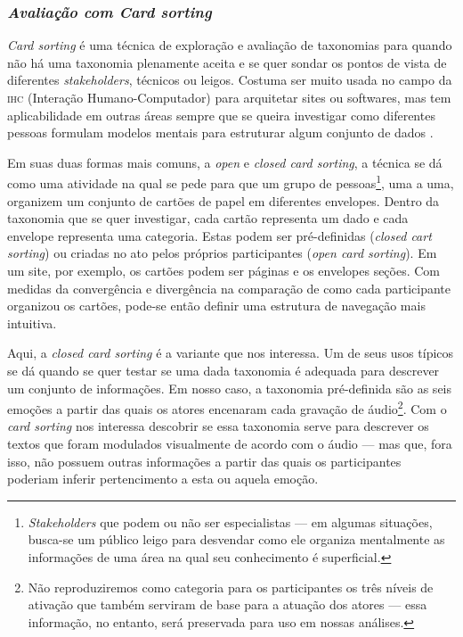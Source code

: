 \documentclass[a4paper,11pt,titlepage,singlespacing]{article}
\begin{document}
\subsubsection*{\textit{Avaliação com Card sorting}}

\textit{Card sorting} é uma técnica de exploração e avaliação de taxonomias para quando não há uma taxonomia plenamente aceita e se quer sondar os pontos de vista de diferentes \textit{stakeholders}, técnicos ou leigos. Costuma ser muito usada no campo da \textsc{ihc} (Interação Humano-Computador) para arquitetar sites ou softwares, mas tem aplicabilidade em outras áreas sempre que se queira investigar como diferentes pessoas formulam modelos mentais para estruturar algum conjunto de dados \cite{about_cardsorting}.

Em suas duas formas mais comuns, a \textit{open} e \textit{closed card sorting}, a técnica se dá como uma atividade na qual se pede para que um grupo de pessoas\footnote{\textit{Stakeholders} que podem ou não ser especialistas — em algumas situações, busca-se um público leigo para desvendar como ele organiza mentalmente as informações de uma área na qual seu conhecimento é superficial.}, uma a uma, organizem um conjunto de cartões de papel em diferentes envelopes. Dentro da taxonomia que se quer investigar, cada cartão representa um dado e cada envelope representa uma categoria. Estas podem ser pré-definidas (\textit{closed cart sorting}) ou criadas no ato pelos próprios participantes (\textit{open card sorting}). Em um site, por exemplo, os cartões podem ser páginas e os envelopes seções. Com medidas da convergência e divergência na comparação de como cada participante organizou os cartões, pode-se então definir uma estrutura de navegação mais intuitiva.

Aqui, a \textit{closed card sorting} é a variante que nos interessa. Um de seus usos típicos se dá quando se quer testar se uma dada taxonomia é adequada para descrever um conjunto de informações. Em nosso caso, a taxonomia pré-definida são as seis emoções a partir das quais os atores encenaram cada gravação de áudio\footnote{Não reproduziremos como categoria para os participantes os três níveis de ativação que também serviram de base para a atuação dos atores — essa informação, no entanto, será preservada para uso em nossas análises.}. Com o \textit{card sorting} nos interessa descobrir se essa taxonomia serve para descrever os textos que foram modulados visualmente de acordo com o áudio — mas que, fora isso, não possuem outras informações a partir das quais os participantes poderiam inferir pertencimento a esta ou aquela emoção.
\end{document}
